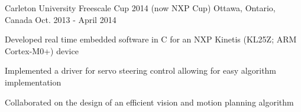 \begin{cventries}
  \cventry
    {Carleton University} %
    {Freescale Cup 2014 (now NXP Cup)} %
    {Ottawa, Ontario, Canada} %
    {Oct. 2013 - April 2014} %
    {
      \begin{cvitems} %
        \item {Developed real time embedded software in C for an NXP Kinetis (KL25Z; ARM Cortex-M0+) device}
        \item {Implemented a driver for servo steering control allowing for easy algorithm implementation}
        \item {Collaborated on the design of an efficient vision and motion planning algorithm}
      \end{cvitems}
    }

\end{cventries}
